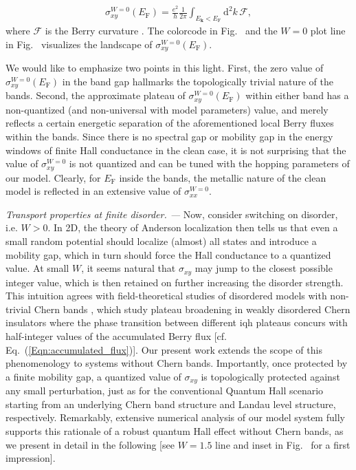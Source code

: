 \documentclass[aps,prb,amsmath,amssymb,twocolumn, superscriptaddress]{revtex4-2}
\newcommand{\eq}[1]{Eq.~(\ref{#1})}
\begin{document}
\begin{align}
\sigma_{xy}^{W=0}(E_\mathrm{F}) = \frac{e^2}{h} \frac{1}{2\pi}\int_{E_{\bm k}<E_\mathrm{F}}\mathrm{d}^2k \,  \mathcal F, \label{Eqn:accumulated_flux}
\end{align}
where $\mathcal F$ is the Berry curvature \cite{Supplemental}. The colorcode in Fig.~ and the $W=0$ plot line in Fig.~  visualizes the landscape of $\sigma_{xy}^{W=0}(E_\mathrm{F})$.

We would like to emphasize two points in this light. First, the zero value of $\sigma_{xy}^{W=0}(E_\mathrm{F})$ in the band gap hallmarks the topologically trivial nature of the bands. Second, the approximate plateau of $\sigma_{xy}^{W=0}(E_\mathrm{F})$ within either band has a non-quantized (and non-universal with model parameters) value, and merely reflects a certain energetic separation of the aforementioned local Berry fluxes within the bands. Since there is no spectral gap or mobility gap in the energy windows of finite Hall conductance in the clean case, it is not surprising that the value of $\sigma_{xy}^{W=0}$ is not quantized and can be tuned with the hopping parameters of our model. Clearly, for $E_\mathrm{F}$ inside the bands, the metallic nature of the clean model is reflected in an extensive value of $\sigma_{xx}^{W=0}$. 

{\it Transport properties at finite disorder. ---}
Now, consider switching on disorder, i.e. $W>0$. In 2D, the theory of Anderson localization then tells us that even a small random potential should localize (almost) all states and introduce a mobility gap, which in turn should force the Hall conductance to a quantized value. At small $W$, it seems natural that $\sigma_{xy}$ may jump to the closest possible integer value, which is then retained on further increasing the disorder strength. This intuition agrees with field-theoretical studies of disordered models with non-trivial Chern bands \cite{Pruisken_1, Pruisken_2, Pruisken_3, Khmelnitskii, Disordered_graphene, field_theory_disordered_CI}, which study plateau broadening in weakly disordered Chern insulators where the phase transition between different \gls{iqh} plateaus concurs with half-integer values of the accumulated Berry flux [cf. \eq{Eqn:accumulated_flux}]. Our present work extends the scope of this phenomenology to systems without Chern bands. Importantly, once protected by a finite mobility gap, a quantized value of $\sigma_{xy}$ is topologically protected against any small perturbation, just as for the conventional Quantum Hall scenario starting from an underlying Chern band structure and Landau level structure, respectively. Remarkably, extensive numerical analysis of our model system fully supports this rationale of a robust quantum Hall effect without Chern bands, as we present in detail in the following [see $W=1.5$ line and inset in Fig.~ for a first impression]. 
\end{document}
